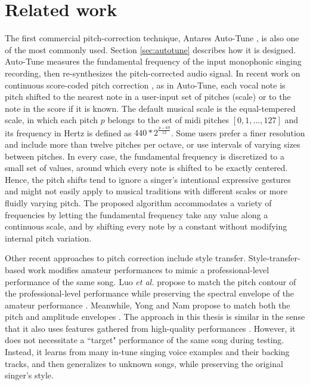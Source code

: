 \section{Related work}
The first commercial pitch-correction technique, Antares Auto-Tune \cite{antares:2016}, is also one of the most commonly used. Section \ref{sec:autotune} describes how it is designed. Auto-Tune measures the fundamental frequency of the input monophonic singing recording, then re-synthesizes the pitch-corrected audio signal. In recent work on continuous score-coded pitch correction \cite{salazar2015continuous}, as in Auto-Tune, each vocal note is pitch shifted to the nearest note in a user-input set of pitches (scale) or to the note in the score if it is known. The default musical scale is the equal-tempered scale, in which each pitch $p$ belongs to the set of \gls{midi} pitches $[0, 1, ..., 127]$ and its frequency in Hertz is defined as $440*2^{\frac{p-69}{12}}$. Some users prefer a finer resolution and include more than twelve pitches per octave, or use intervals of varying sizes between pitches. In every case, the fundamental frequency is discretized to a small set of values, around which every note is shifted to be exactly centered. Hence, the pitch shifts tend to ignore a singer's intentional expressive gestures and might not easily apply to musical traditions with different scales or more fluidly varying pitch. The proposed algorithm accommodates a variety of frequencies by letting the fundamental frequency take any value along a continuous scale, and by shifting every note by a constant without modifying internal pitch variation.

Other recent approaches to pitch correction include style transfer. Style-transfer-based work modifies amateur performances to mimic a professional-level performance of the same song. Luo \textit{et al.} propose to match the pitch contour of the professional-level performance while preserving the spectral envelope of the amateur performance \cite{luo2018singing}. Meanwhile, Yong and Nam propose to match both the pitch and amplitude envelopes \cite{yong2018singing}. The approach in this thesis is similar in the sense that it also uses features gathered from high-quality performances \cite{wager2018intonation}. However, it does not necessitate a ``target" performance of the same song during testing. Instead, it learns from many in-tune singing voice examples and their backing tracks, and then generalizes to unknown songs, while preserving the original singer's style.

